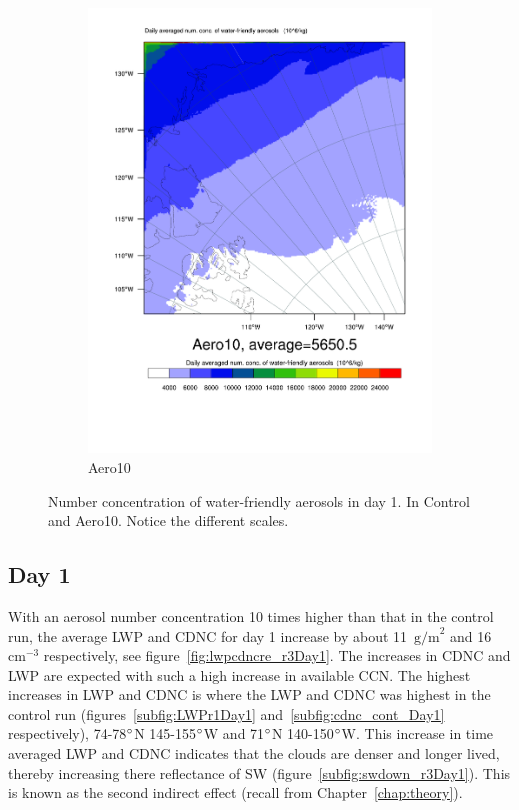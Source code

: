 \begin{figure}[hb]
\begin{subfigure}{0.48\textwidth}
		\includegraphics[width=\textwidth]{results/Aero10/Aero10_QNWFA_Day1.pdf}
		\caption{Aero10}
		\label{subfig:qnwfa_r3}
	\end{subfigure}
\caption{Number concentration of water-friendly aerosols in day 1. In Control and Aero10. Notice the different scales.}
\label{fig:aerosols}
\end{figure}


\subsection{Day 1}
With an aerosol number concentration 10 times higher than that in the control run, the average LWP and CDNC for day 1 increase by about 11~$\text{g/m}^2$ and 16~$\text{cm}^{-3}$ respectively, see figure~\ref{fig:lwpcdncre_r3Day1}. The increases in CDNC and LWP are expected with such a high increase in available CCN. The highest increases in LWP and CDNC is where the LWP and CDNC was highest in the control run (figures~\ref{subfig:LWPr1Day1} and~\ref{subfig:cdnc_cont_Day1} respectively), 74-78$\degree$N 145-155$\degree$W and 71$\degree$N 140-150$\degree$W. This increase in time averaged LWP and CDNC indicates that the clouds are denser and longer lived, thereby increasing there reflectance of SW (figure~\ref{subfig:swdown_r3Day1}). This is known as the second indirect effect (recall from Chapter~\ref{chap:theory}).

